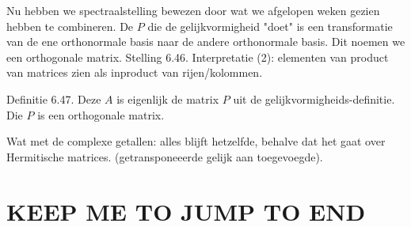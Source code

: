 \documentclass{article}
\begin{document}
Nu hebben we spectraalstelling bewezen door  wat we afgelopen weken 
gezien hebben te combineren. 
De $P$ die de gelijkvormigheid "doet" is een transformatie van de ene orthonormale basis naar de andere orthonormale basis. Dit noemen we een orthogonale matrix. 
Stelling 6.46. Interpretatie (2): elementen van product van matrices zien als inproduct van rijen/kolommen. 

Definitie 6.47. Deze $A$ is eigenlijk de matrix $P$ uit de gelijkvormigheids-definitie. Die $P$ is een orthogonale matrix. 

Wat met de complexe getallen: alles blijft hetzelfde, behalve dat het gaat over Hermitische matrices. (getransponeeerde gelijk aan toegevoegde). 


\section*{KEEP ME TO JUMP TO END}
\end{document}

